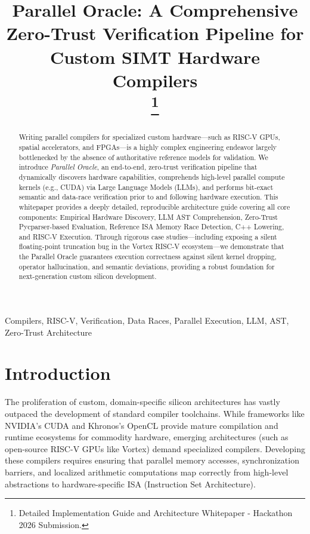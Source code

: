\documentclass[10pt, conference, compsocconf]{IEEEtran}
\begin{document}
\title{Parallel Oracle: A Comprehensive Zero-Trust Verification Pipeline for Custom SIMT Hardware Compilers\\
\thanks{Detailed Implementation Guide and Architecture Whitepaper - Hackathon 2026 Submission.}
}

\author{
}

\maketitle

\begin{abstract}
Writing parallel compilers for specialized custom hardware—such as RISC-V GPUs, spatial accelerators, and FPGAs—is a highly complex engineering endeavor largely bottlenecked by the absence of authoritative reference models for validation. We introduce \textit{Parallel Oracle}, an end-to-end, zero-trust verification pipeline that dynamically discovers hardware capabilities, comprehends high-level parallel compute kernels (e.g., CUDA) via Large Language Models (LLMs), and performs bit-exact semantic and data-race verification prior to and following hardware execution. This whitepaper provides a deeply detailed, reproducible architecture guide covering all core components: Empirical Hardware Discovery, LLM AST Comprehension, Zero-Trust Pycparser-based Evaluation, Reference ISA Memory Race Detection, C++ Lowering, and RISC-V Execution. Through rigorous case studies—including exposing a silent floating-point truncation bug in the Vortex RISC-V ecosystem—we demonstrate that the Parallel Oracle guarantees execution correctness against silent kernel dropping, operator hallucination, and semantic deviations, providing a robust foundation for next-generation custom silicon development.
\end{abstract}

\begin{IEEEkeywords}
Compilers, RISC-V, Verification, Data Races, Parallel Execution, LLM, AST, Zero-Trust Architecture
\end{IEEEkeywords}

\section{Introduction}
The proliferation of custom, domain-specific silicon architectures has vastly outpaced the development of standard compiler toolchains. While frameworks like NVIDIA's CUDA and Khronos's OpenCL provide mature compilation and runtime ecosystems for commodity hardware, emerging architectures (such as open-source RISC-V GPUs like Vortex) demand specialized compilers. Developing these compilers requires ensuring that parallel memory accesses, synchronization barriers, and localized arithmetic computations map correctly from high-level abstractions to hardware-specific ISA (Instruction Set Architecture).
\end{document}
